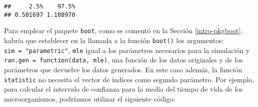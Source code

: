 \documentclass[
]{book}
\newenvironment{Shaded}{\begin{snugshade}}{\end{snugshade}}
\newcommand{\DecValTok}[1]{\textcolor[rgb]{0.00,0.00,0.81}{#1}}
\newcommand{\KeywordTok}[1]{\textcolor[rgb]{0.13,0.29,0.53}{\textbf{#1}}}
\newcommand{\NormalTok}[1]{#1}
\newcommand{\OperatorTok}[1]{\textcolor[rgb]{0.81,0.36,0.00}{\textbf{#1}}}
\newcommand{\StringTok}[1]{\textcolor[rgb]{0.31,0.60,0.02}{#1}}
\theoremstyle{break}
\theoremstyle{definition}
\theoremstyle{definition}
\theoremstyle{definition}
\theoremstyle{remark}
\begin{document}
\begin{Shaded}
\end{Shaded}

\begin{verbatim}
##     2.5%    97.5% 
## 0.501697 1.108970
\end{verbatim}

Para emplear el paquete \texttt{boot}, como se comentó en la Sección
\ref{intro-pkgboot}, habría que establecer en la llamada a la
función \texttt{boot()} los argumentos: \texttt{sim\ =\ "parametric"},
\texttt{mle} igual a los parámetros necesarios para la simulación y
\texttt{ran.gen\ =\ function(data,\ mle)}, una función de los datos originales
y de los parámetros que devuelve los datos generados.
En este caso además, la función \texttt{statistic} no necesita el vector
de índices como segundo parámetro.
Por ejemplo, para calcular el intervalo de confianza para la media del
tiempo de vida de los microorganismos, podríamos utilizar el siguiente código:
\end{document}
